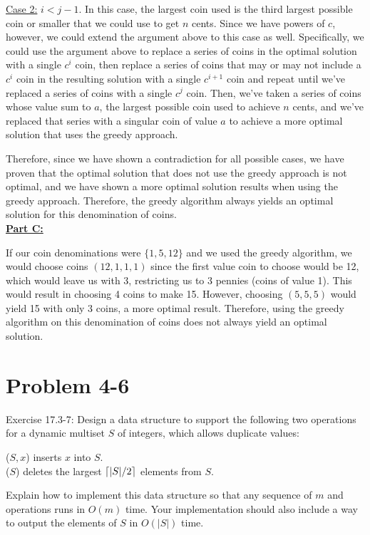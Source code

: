 \documentclass[11pt]{article}
\DeclarePairedDelimiter{\ceil}{\lceil}{\rceil}
\begin{document}
\underline{Case 2:} $i < j - 1$. In this case, the largest coin used is the third largest possible coin or smaller that we could use to get $n$ cents. Since we have powers of $c$, however, we could extend the argument above to this case as well. Specifically, we could use the argument above to replace a series of coins in the optimal solution with a single $c^i$ coin, then replace a series of coins that may or may not include a $c^i$ coin in the resulting solution with a single $c^{i+1}$ coin and repeat until we've replaced a series of coins with a single $c^j$ coin. Then, we've taken a series of coins whose value sum to $a$, the largest possible coin used to achieve $n$ cents, and we've replaced that series with a singular coin of value $a$ to achieve a more optimal solution that uses the greedy approach.

Therefore, since we have shown a contradiction for all possible cases, we have proven that the optimal solution that does not use the greedy approach is not optimal, and we have shown a more optimal solution results when using the greedy approach. Therefore, the greedy algorithm always yields an optimal solution for this denomination of coins.\\

\underline{\textbf{Part C:}}

If our coin denominations were $\{1,5,12\}$ and we used the greedy algorithm, we would choose coins $(12,1,1,1)$ since the first value coin to choose would be 12, which would leave us with 3, restricting us to 3 pennies (coins of value 1). This would result in choosing 4 coins to make 15. However, choosing $(5,5,5)$ would yield 15 with only 3 coins, a more optimal result. Therefore, using the greedy algorithm on this denomination of coins does not always yield an optimal solution.


\newpage

\section{Problem 4-6}
Exercise 17.3-7: Design a data structure to support the following two operations for a dynamic multiset $S$ of integers, which allows duplicate values:

($S,x$) inserts $x$ into $S$.\\
($S$) deletes the largest $\ceil{|S| / 2}$ elements from $S$.

Explain how to implement this data structure so that any sequence of $m$  and  operations runs in $O(m)$ time. Your implementation should also include a way to output the elements of $S$ in $O(|S|)$ time.
\end{document}
